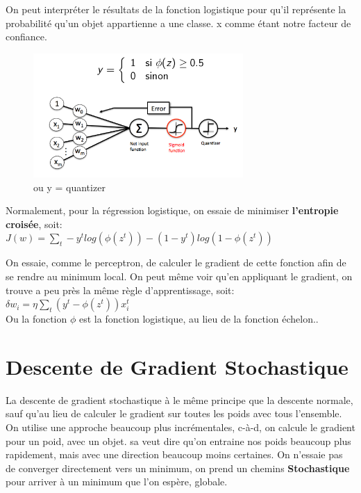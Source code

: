 \documentclass[oneside]{book}
\begin{document}
On peut interpréter le résultats de la fonction logistique pour qu'il représente la probabilité qu'un objet appartienne a une classe. x comme étant notre facteur de confiance.\\

\begin{figure}[!ht]
\centering
\includegraphics[width= 8cm]{logistique.png}
\caption{ou y = quantizer}
\end{figure}

Normalement, pour la régression logistique, on essaie de minimiser \textbf{l'entropie croisée}, soit: \\

\centering
$J(w) = \sum\limits_t -y^t log(\phi(z^t)) - (1 - y^t)log(1-\phi(z^t))$\\
\justify

On essaie, comme le perceptron, de calculer le gradient de cette fonction afin de se rendre au minimum local. On peut même voir qu'en appliquant le gradient, on trouve a peu près la même règle d'apprentissage, soit:\\

$\delta w_i = \eta \sum\limits_t (y^t - \phi(z^t)) x_i^t$\\


Ou la fonction $\phi$ est la fonction logistique, au lieu de la fonction échelon..\\

\section{Descente de Gradient Stochastique}
La descente de gradient stochastique à le même principe que la descente normale, sauf qu'au lieu de calculer le gradient sur toutes les poids avec tous l'ensemble. On utilise une approche beaucoup plus incrémentales, c-à-d, on calcule le gradient pour un poid, avec un objet. sa veut dire qu'on entraine nos poids beaucoup plus rapidement, mais avec une direction beaucoup moins certaines. On n'essaie pas de converger directement vers un minimum, on prend un chemins \textbf{Stochastique} pour arriver à un minimum que l'on espère, globale.\\
\end{document}
